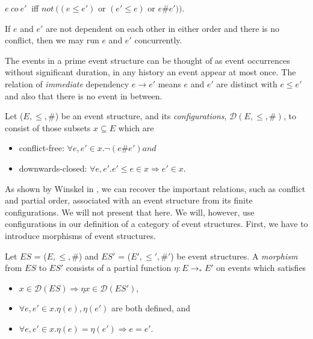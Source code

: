     \begin{center}
        $e\ co\ e'\ $ iff $not\ ((e \leq e')$ or $(e' \leq e)$ or $e \# e'))$.
    \end{center}

If $e$ and $e'$ are not dependent on each other in either order and there is no conflict, then we may run $e$ and $e'$ concurrently.

The events in a prime event structure can be thought of as event occurrences without significant duration, in any history an event appear at most once. The relation of \emph{immediate} dependency $e \rightarrow e'$ means $e$ and $e'$ are distinct with $e \leq e'$ and also that there is no event in between.

 \begin{definition}\label{def:configurations-event-structure}
    Let ($E, \leq, \#$) be an event structure, and its \emph{configurations}, $\mathcal{D}(E, \leq, \#)$, to consist of those subsets $x \subseteq E$ which are
    
    \begin{itemize}
        \item conflict-free: $\forall e, e' \in x . \neg (e \# e') and$
        \item downwards-closed: $\forall e, e' . e' \leq e \in x \Rightarrow e' \in x$.
    \end{itemize}
\end{definition}

As shown by Winskel in \cite[Proposition 18]{winskel95modelsCategory}, we can recover the important relations, such as conflict and partial order, associated with an event structure from its finite configurations. We will not present that here. We will, however, use configurations in our definition of a category of event structures. First, we have to introduce morphisms of event structures.

 \begin{definition}\label{def:morphisms-event-structure}
    Let $ES$ = ($E, \leq, \#$) and $ES'$ = ($E', \leq', \#'$) be event structures. A \emph{morphism} from $ES$ to $ES'$ consists of a partial function $\eta : E \rightarrow_{*} E'$ on events which satisfies
    
    \begin{itemize}
        \item $x \in \mathcal{D}(ES) \Rightarrow \eta x \in \mathcal{D}(ES')$,
        \item $\forall e, e' \in x . \eta (e), \eta (e')$ are both defined, and
        \item $\forall e, e' \in x . \eta (e) = \eta (e') \Rightarrow e = e'$.
    \end{itemize}
\end{definition}

